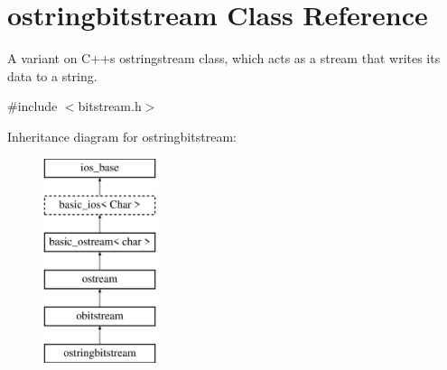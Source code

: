 \hypertarget{classostringbitstream}{}\section{ostringbitstream Class Reference}
\label{classostringbitstream}


A variant on C++\textquotesingle{}s ostringstream class, which acts as a stream that writes its data to a string.  




{\ttfamily \#include $<$bitstream.\+h$>$}

Inheritance diagram for ostringbitstream\+:\begin{figure}[H]
\begin{center}
\leavevmode
\includegraphics[height=6.000000cm]{classostringbitstream}
\end{center}
\end{figure}
